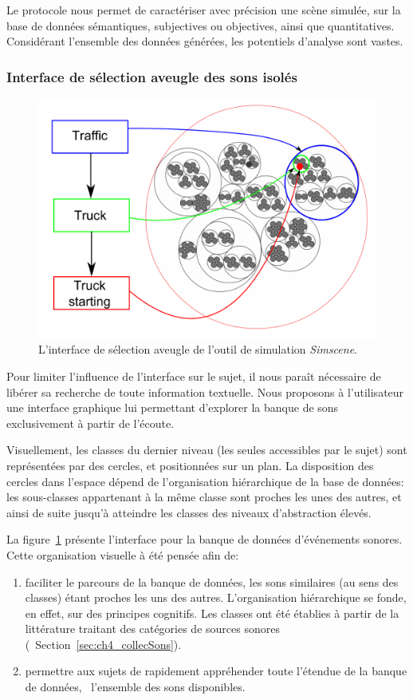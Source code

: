 Le protocole nous permet de caractériser avec précision une scène simulée, sur la base de données sémantiques, subjectives ou objectives, ainsi que quantitatives. Considérant l'ensemble des données générées, les potentiels d'analyse sont vastes.

\subsubsection{Interface de sélection aveugle des sons isolés}
\label{sec:ch4_ssf}

\begin{figure}[t]
        \myfloatalign
        \includegraphics[width=.8\linewidth]{gfx/ch_4/SSF}
       \caption{L'interface de sélection aveugle de l'outil de simulation \emph{Simscene}.}\label{fig:ssf}
\end{figure}

Pour limiter l’influence de l’interface sur le sujet, il nous paraît nécessaire de libérer sa recherche de toute information textuelle. Nous proposons à l'utilisateur une interface graphique lui permettant d’explorer la banque de sons exclusivement à partir de l’écoute.

Visuellement, les classes du dernier niveau (les seules accessibles par le sujet) sont représentées par des cercles, et positionnées sur un plan. La disposition des cercles dans l'espace dépend de l’organisation hiérarchique de la base de données: les sous-classes appartenant à la même classe sont proches les unes des autres, et ainsi de suite jusqu'à atteindre les classes des niveaux d'abstraction élevés.

La figure~\ref{fig:ssf} présente l'interface pour la banque de données d'événements sonores. Cette organisation visuelle à été pensée afin de:

\begin{enumerate}
\item faciliter le parcours de la banque de données, les sons similaires (au sens des classes) étant proches les uns des autres. L'organisation hiérarchique se fonde, en effet, sur des principes cognitifs. Les classes ont été établies à partir de la littérature traitant des catégories de sources sonores (\cf~Section~\ref{sec:ch4_collecSons}).
\item permettre aux sujets de rapidement appréhender toute l'étendue de la banque de données, \ie~l'ensemble des sons disponibles.
\end{enumerate}

